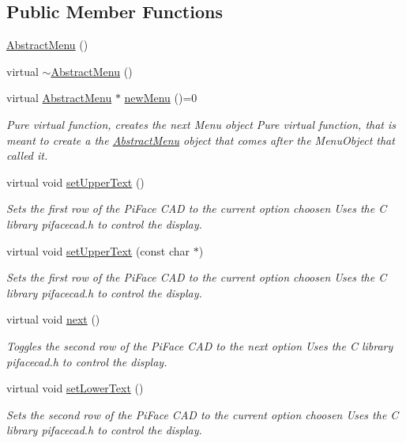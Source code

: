 \subsection*{Public Member Functions}
\begin{DoxyCompactItemize}
\item 
\hyperlink{classAbstractMenu_a45d32cb02984b79e6bc6f6e930ee5c8c}{Abstract\+Menu} ()
\item 
virtual \hyperlink{classAbstractMenu_af4aacdda3e23fedf1de7781befe22116}{$\sim$\+Abstract\+Menu} ()
\item 
virtual \hyperlink{classAbstractMenu}{Abstract\+Menu} $\ast$ \hyperlink{classAbstractMenu_aef49c4a4ceeb1aad12101cb4768e1596}{new\+Menu} ()=0
\begin{DoxyCompactList}\small\item\em Pure virtual function, creates the next Menu object Pure virtual function, that is meant to create a the \hyperlink{classAbstractMenu}{Abstract\+Menu} object that comes after the Menu\+Object that called it. \end{DoxyCompactList}\item 
virtual void \hyperlink{classAbstractMenu_a4163c42d2127430e184612cb95211cda}{set\+Upper\+Text} ()
\begin{DoxyCompactList}\small\item\em Sets the first row of the Pi\+Face C\+AD to the current option choosen Uses the C library pifacecad.\+h to control the display. \end{DoxyCompactList}\item 
virtual void \hyperlink{classAbstractMenu_ab07feae31d2527f2830188fc10bcb728}{set\+Upper\+Text} (const char $\ast$)
\begin{DoxyCompactList}\small\item\em Sets the first row of the Pi\+Face C\+AD to the current option choosen Uses the C library pifacecad.\+h to control the display. \end{DoxyCompactList}\item 
virtual void \hyperlink{classAbstractMenu_afc9ee4bf101f2761b4e8e083ef3c4a9b}{next} ()
\begin{DoxyCompactList}\small\item\em Toggles the second row of the Pi\+Face C\+AD to the next option Uses the C library pifacecad.\+h to control the display. \end{DoxyCompactList}\item 
virtual void \hyperlink{classAbstractMenu_a5fd1c385e4acd825631ede5bb0424a5c}{set\+Lower\+Text} ()
\begin{DoxyCompactList}\small\item\em Sets the second row of the Pi\+Face C\+AD to the current option choosen Uses the C library pifacecad.\+h to control the display. \end{DoxyCompactList}\end{DoxyCompactItemize}
